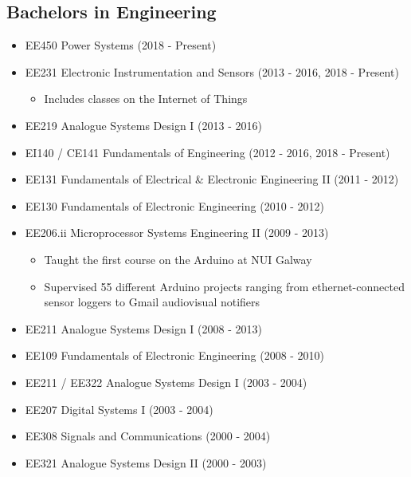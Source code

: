 \documentclass[10pt,a4paper]{res} %
\begin{document}
\begin{resume}
\subsection*{Bachelors in Engineering}

\begin{itemize} \itemsep -2pt
\item EE450 Power Systems (2018 - Present)
\item EE231 Electronic Instrumentation and Sensors (2013 - 2016, 2018 - Present)
\begin{itemize} \itemsep -2pt
\item Includes classes on the Internet of Things
\end{itemize}
\item EE219 Analogue Systems Design I (2013 - 2016)
\item EI140 / CE141 Fundamentals of Engineering (2012 - 2016, 2018 - Present)
\item EE131 Fundamentals of Electrical \& Electronic Engineering II (2011 - 2012)
\item EE130 Fundamentals of Electronic Engineering (2010 - 2012)
\item EE206.ii Microprocessor Systems Engineering II (2009 - 2013)
\begin{itemize} \itemsep -2pt
\item Taught the first course on the Arduino at NUI Galway
\item Supervised 55 different Arduino projects ranging from ethernet-connected sensor loggers to Gmail audiovisual notifiers
\end{itemize}
\item EE211 Analogue Systems Design I (2008 - 2013)
\item EE109 Fundamentals of Electronic Engineering (2008 - 2010)
\item EE211 / EE322 Analogue Systems Design I (2003 - 2004)
\item EE207 Digital Systems I (2003 - 2004)
\item EE308 Signals and Communications (2000 - 2004)
\item EE321 Analogue Systems Design II (2000 - 2003)
\end{itemize}


\vspace{0.2in} %



\end{resume}
\end{document}
